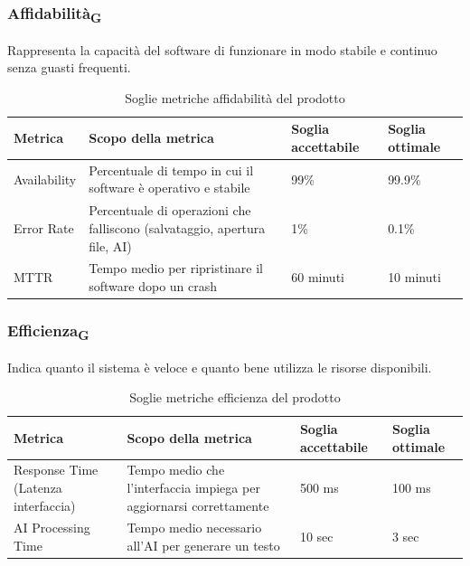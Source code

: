 \documentclass[11pt,a4paper]{article}
\begin{document}
\subsubsection{Affidabilità\textsubscript{G}}
Rappresenta la capacità del software di funzionare in modo stabile e continuo senza guasti frequenti.
\begin{table}[H]
\centering
\renewcommand{\arraystretch}{1.5}
\begin{tabular}{|M{0.25\textwidth}|M{0.35\textwidth}|M{0.15\textwidth}|M{0.15\textwidth}|}
\hline
\textbf{Metrica} & \textbf{Scopo della metrica} & \textbf{Soglia accettabile} & \textbf{Soglia ottimale} \\
\hline
Availability & Percentuale di tempo in cui il software è operativo e stabile & 99\% & 99.9\% \\ \hline
Error Rate & Percentuale di operazioni che falliscono (salvataggio, apertura file, AI) & 1\% & 0.1\% \\ \hline
MTTR & Tempo medio per ripristinare il software dopo un crash & 60 minuti & 10 minuti \\
\hline
\end{tabular}
\caption{Soglie metriche affidabilità del prodotto}
\end{table}

\subsubsection{Efficienza\textsubscript{G}}
Indica quanto il sistema è veloce e quanto bene utilizza le risorse disponibili.
\begin{table}[H]
\centering
\renewcommand{\arraystretch}{1.5}
\begin{tabular}{|M{0.25\textwidth}|M{0.35\textwidth}|M{0.15\textwidth}|M{0.15\textwidth}|}
\hline
\textbf{Metrica} & \textbf{Scopo della metrica} & \textbf{Soglia accettabile} & \textbf{Soglia ottimale} \\
\hline
Response Time (Latenza interfaccia) & Tempo medio che l'interfaccia impiega per aggiornarsi correttamente & 500 ms & 100 ms \\ \hline
AI Processing Time & Tempo medio necessario all’AI per generare un testo & 10 sec & 3 sec \\
\hline
\end{tabular}
\caption{Soglie metriche efficienza del prodotto}
\end{table}
\end{document}
